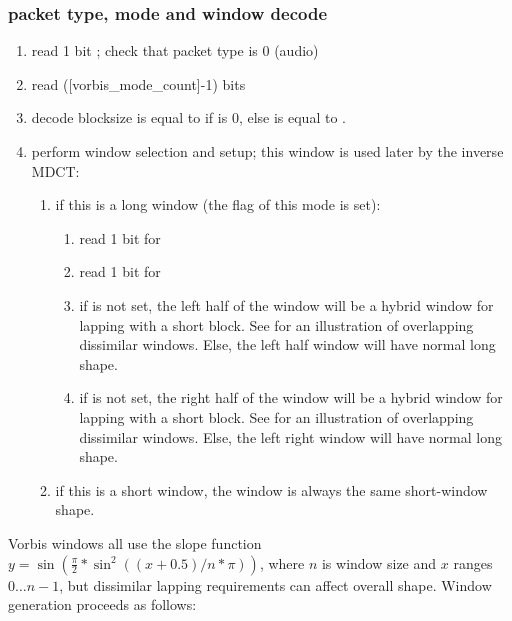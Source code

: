\subsubsection{packet type, mode and window decode}

\begin{enumerate}
 \item read 1 bit ; check that packet type is 0 (audio)
 \item read ([vorbis\_mode\_count]-1) bits
 \item decode blocksize \varname{[n]} is equal to \varname{[blocksize\_0]} if
 is 0, else \varname{[n]} is equal to \varname{[blocksize\_1]}.
 \item perform window selection and setup; this window is used later by the inverse MDCT:
  \begin{enumerate}
   \item if this is a long window (the  flag of this mode is
set):
    \begin{enumerate}
     \item read 1 bit for 
     \item read 1 bit for 
     \item if  is not set, the left half
         of the window will be a hybrid window for lapping with a
         short block.  See  for an illustration of overlapping
dissimilar
         windows. Else, the left half window will have normal long
         shape.
     \item if  is not set, the right half of
         the window will be a hybrid window for lapping with a short
         block.  See  for an
illustration of overlapping dissimilar
         windows. Else, the left right window will have normal long
         shape.
    \end{enumerate}

   \item  if this is a short window, the window is always the same
       short-window shape.
  \end{enumerate}

\end{enumerate}

Vorbis windows all use the slope function $y=\sin(\frac{\pi}{2} * \sin^2((x+0.5)/n * \pi))$,
where $n$ is window size and $x$ ranges $0 \ldots n-1$, but dissimilar
lapping requirements can affect overall shape.  Window generation
proceeds as follows:

